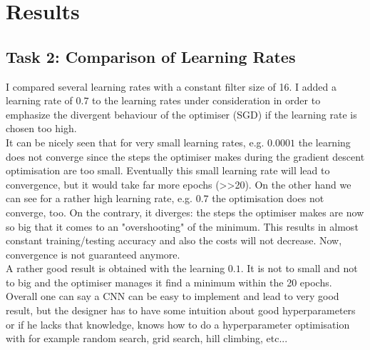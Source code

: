 \documentclass[paper=a4, fontsize=11pt]{scrartcl} %
\numberwithin{equation}{section} %
\numberwithin{figure}{section} %
\numberwithin{table}{section} %
\begin{document}
\section{Results}
\subsection{Task 2: Comparison of Learning Rates}

I compared several learning rates with a constant filter size of 16. I added a learning rate of $0.7$ to the learning rates under consideration in order to emphasize the divergent behaviour of the optimiser (SGD) if the learning rate is chosen too high.\\
It can be nicely seen that for very small learning rates, e.g. $0.0001$ the learning does not converge since the steps the optimiser makes during the gradient descent optimisation are too small. Eventually this small learning rate will lead to convergence, but it would take far more epochs (>>20). On the other hand we can see for a rather high learning rate, e.g. $0.7$ the optimisation does not converge, too. On the contrary, it diverges: the steps the optimiser makes are now so big that it comes to an "overshooting" of the minimum. This results in almost constant training/testing accuracy and also the costs will not decrease. Now, convergence is not guaranteed anymore.\\
A rather good result is obtained with the learning $0.1$. It is not to small and not to big and the optimiser manages it find a minimum within the 20 epochs.\\
Overall one can say a CNN can be easy to implement and lead to very good result, but the designer has to have some intuition about good hyperparameters or if he lacks that knowledge, knows how to do a hyperparameter optimisation with for example random search, grid search, hill climbing, etc...
\end{document}
